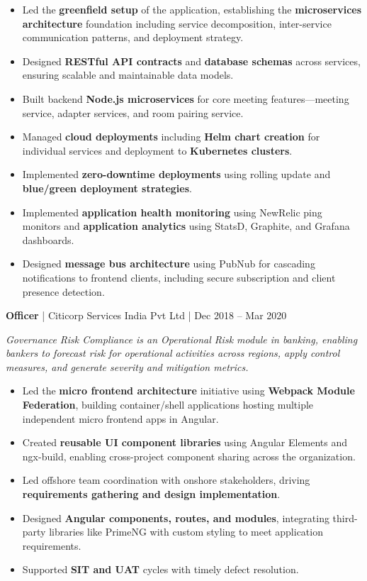\documentclass[a4paper,11pt]{article}
\newcommand{\jobtitle}[4]{
  \vspace{6pt}
  {\textbf{\textcolor{accent}{#1}} | #2 | #3}
  \vspace{2pt}
}
\begin{document}
\begin{itemize}[leftmargin=*, nosep]
  \item Led the \textbf{greenfield setup} of the application, establishing the \textbf{microservices architecture} foundation including service decomposition, inter-service communication patterns, and deployment strategy.
  \item Designed \textbf{RESTful API contracts} and \textbf{database schemas} across services, ensuring scalable and maintainable data models.
  \item Built backend \textbf{Node.js microservices} for core meeting features---meeting service, adapter services, and room pairing service.
  \item Managed \textbf{cloud deployments} including \textbf{Helm chart creation} for individual services and deployment to \textbf{Kubernetes clusters}.
  \item Implemented \textbf{zero-downtime deployments} using rolling update and \textbf{blue/green deployment strategies}.
  \item Implemented \textbf{application health monitoring} using NewRelic ping monitors and \textbf{application analytics} using StatsD, Graphite, and Grafana dashboards.
  \item Designed \textbf{message bus architecture} using PubNub for cascading notifications to frontend clients, including secure subscription and client presence detection.
\end{itemize}

\vspace{8pt}
\jobtitle{Officer}{Citicorp Services India Pvt Ltd}{Dec 2018 -- Mar 2020}{}

\textit{Governance Risk Compliance is an Operational Risk module in banking, enabling bankers to forecast risk for operational activities across regions, apply control measures, and generate severity and mitigation metrics.}

\begin{itemize}[leftmargin=*, nosep]
  \item Led the \textbf{micro frontend architecture} initiative using \textbf{Webpack Module Federation}, building container/shell applications hosting multiple independent micro frontend apps in Angular.
  \item Created \textbf{reusable UI component libraries} using Angular Elements and ngx-build, enabling cross-project component sharing across the organization.
  \item Led offshore team coordination with onshore stakeholders, driving \textbf{requirements gathering and design implementation}.
  \item Designed \textbf{Angular components, routes, and modules}, integrating third-party libraries like PrimeNG with custom styling to meet application requirements.
  \item Supported \textbf{SIT and UAT} cycles with timely defect resolution.
\end{itemize}
\end{document}
